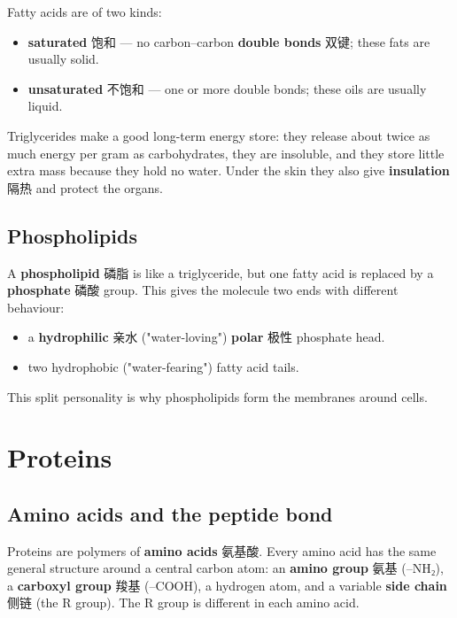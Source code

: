 \documentclass[11pt]{article}
\begin{document}
Fatty acids are of two kinds:

\begin{itemize}
\item \textbf{saturated} 饱和 — no carbon–carbon \textbf{double bonds} 双键; these fats are usually solid.

\item \textbf{unsaturated} 不饱和 — one or more double bonds; these oils are usually liquid.

\end{itemize}

Triglycerides make a good long-term energy store: they release about twice as much energy per gram as carbohydrates, they are insoluble, and they store little extra mass because they hold no water. Under the skin they also give \textbf{insulation} 隔热 and protect the organs.

\subsection*{Phospholipids}

A \textbf{phospholipid} 磷脂 is like a triglyceride, but one fatty acid is replaced by a \textbf{phosphate} 磷酸 group. This gives the molecule two ends with different behaviour:

\begin{itemize}
\item a \textbf{hydrophilic} 亲水 ("water-loving") \textbf{polar} 极性 phosphate head.

\item two hydrophobic ("water-fearing") fatty acid tails.

\end{itemize}

This split personality is why phospholipids form the membranes around cells.

\section*{Proteins}

\subsection*{Amino acids and the peptide bond}

Proteins are polymers of \textbf{amino acids} 氨基酸. Every amino acid has the same general structure around a central carbon atom: an \textbf{amino group} 氨基 (–NH₂), a \textbf{carboxyl group} 羧基 (–COOH), a hydrogen atom, and a variable \textbf{side chain} 侧链 (the R group). The R group is different in each amino acid.
\end{document}
